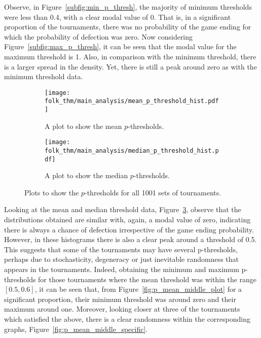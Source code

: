 Observe, in Figure~\ref{subfig:min_p_thresh}, the majority of minimum thresholds
were less than 0.4, with a clear modal value of 0. That is, in a significant
proportion of the tournaments, there was no probability of the game ending for
which the probability of defection was zero. Now considering
Figure~\ref{subfig:max_p_thresh}, it can be seen that the modal value for the
maximum threshold is 1.
Also, in comparison with the minimum threshold, there is a larger spread in the
density. Yet, there is still a peak around zero as with the minimum threshold
data. 

\begin{figure}
    \begin{subfigure}{0.45\textwidth}
        \centering
        \texttt{[image: folk\_thm/main\_analysis/mean\_p\_threshold\_hist.pdf]}
        \caption{A plot to show the mean \(p\)-thresholds.}\label{subfig:mean_p_thresh}
    \end{subfigure}
    \begin{subfigure}{0.45\textwidth}
        \centering
        \texttt{[image: folk\_thm/main\_analysis/median\_p\_threshold\_hist.pdf]}
        \caption{A plot to show the median \(p\)-thresholds.}\label{subfig:median_p_thresh}
    \end{subfigure}
    \caption{Plots to show the \(p\)-thresholds for all 1001 sets of tournaments.}\label{fig:mean_median_p_thresh}
\end{figure}


Looking at the mean and median threshold data,
Figure~\ref{fig:mean_median_p_thresh}, observe that the distributions obtained
are similar with, again, a modal value of zero, indicating there is always a
chance of defection irrespective of the game ending probability. However, in
these histograms there is also a clear peak around a threshold of 0.5. This
suggests that some of the tournaments may have several p-thresholds, perhaps due
to stochasticity, degeneracy or just inevitable randomness that appears in the 
tournaments. Indeed, obtaining the minimum and maximum
p-thresholds for those tournaments where the mean threshold was within the range
\([0.5, 0.6]\), it can be seen that, from Figure~\ref{fig:p_mean_middle_plot}
for a significant proportion, their minimum
threshold was around zero and their maximum around one. Moreover, looking closer
at three of the tournaments which satisfied the above, there is a clear
randomness within the corresponding graphs, Figure~\ref{fig:p_mean_middle_specific}.


